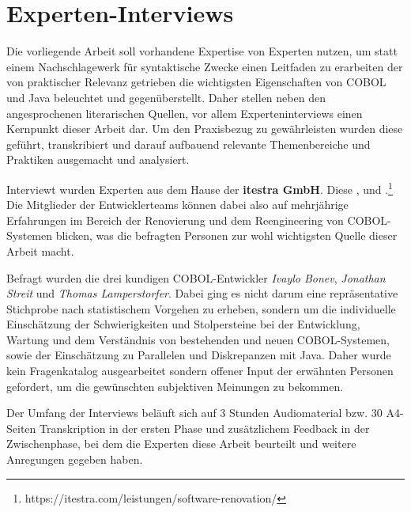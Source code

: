 \section{Experten-Interviews}\label{interviews}
Die vorliegende Arbeit soll vorhandene Expertise von Experten nutzen, um statt einem Nachschlagewerk für syntaktische Zwecke einen Leitfaden zu erarbeiten der von praktischer Relevanz getrieben die wichtigsten Eigenschaften von COBOL und Java beleuchtet und gegenüberstellt. Daher stellen neben den angesprochenen literarischen Quellen, vor allem Experteninterviews einen Kernpunkt dieser Arbeit dar. Um den Praxisbezug zu gewährleisten wurden diese geführt, transkribiert und darauf aufbauend relevante Themenbereiche und Praktiken ausgemacht und analysiert.

Interviewt wurden Experten aus dem Hause der \textbf{itestra GmbH}. Diese ,  und .\footnote{\label{itestraFootnote}https://itestra.com/leistungen/software-renovation/} Die Mitglieder der Entwicklerteams können dabei also auf mehrjährige Erfahrungen im Bereich der Renovierung und dem Reengineering von COBOL-Systemen blicken, was die befragten Personen zur wohl wichtigsten Quelle dieser Arbeit macht.

Befragt wurden die drei kundigen COBOL-Entwickler \textit{Ivaylo Bonev}, \textit{Jonathan Streit} und \textit{Thomas Lamperstorfer}. Dabei ging es nicht darum eine repräsentative Stichprobe nach statistischem Vorgehen zu erheben, sondern um die individuelle Einschätzung der Schwierigkeiten und Stolpersteine bei der Entwicklung, Wartung und dem Verständnis von bestehenden und neuen COBOL-Systemen, sowie der Einschätzung zu Parallelen und Diskrepanzen mit Java. Daher wurde kein Fragenkatalog ausgearbeitet sondern offener Input der erwähnten Personen gefordert, um die gewünschten subjektiven Meinungen zu bekommen. 

Der Umfang der Interviews beläuft sich auf 3 Stunden Audiomaterial bzw. 30 A4-Seiten Transkription in der ersten Phase und zusätzlichem Feedback in der Zwischenphase, bei dem die Experten diese Arbeit beurteilt und weitere Anregungen gegeben haben.